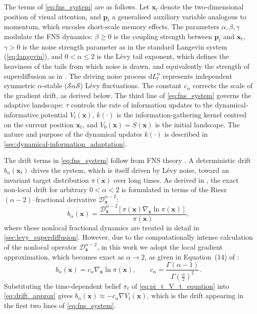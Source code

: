 The terms of \cref{eq:fns_system} are as follows. Let $\mathbf{x}_t$ denote the two-dimensional position of visual attention, and $\mathbf{p}_t$ a generalised auxiliary variable analogous to momentum, which encodes short-scale memory effects. The parameters $\alpha, \beta, \gamma$ modulate the FNS dynamics: $\beta \geq 0$ is the coupling strength between $\mathbf{p}_t$ and $\mathbf{x}_t$, $\gamma > 0$ is the noise strength parameter as in the standard Langevin system (\cref{eq:langevin}), and $0 < \alpha \le 2$ is the Lévy tail exponent, which defines the heaviness of the tails from which noise is drawn, and equivalently the strength of superdiffusion as in . The driving noise process $\mathrm{d}L_t^{\alpha}$ represents independent symmetric $\alpha$-stable ($\mathcal{S}\alpha\mathcal{S}$) L\'evy fluctuations. The constant $c_{\alpha}$ corrects the scale of the gradient drift, as derived below. The third line of \cref{eq:fns_system} governs the adaptive landscape: $\tau$ controls the rate of information updates to the dynamical-informative potential $V_t(\mathbf{x})$, $k(\cdot)$ is the information-gathering kernel centred on the current position $\mathbf{x}_t$, and $V_0(\mathbf{x}) = S(\mathbf{x})$ is the initial landscape. The nature and purpose of the dynamical updates $k(\cdot)$ is described in \cref{sec:dynamical-information_adaptation}.

The drift terms in \cref{eq:fns_system} follow from FNS theory \cite{qi_fractional_2022}. A deterministic drift $b_\alpha(\mathbf{x}_t)$ drives the system, which is itself driven by Lévy noise, toward an invariant target distribution $\pi(\mathbf{x})$ over long times. As derived in \cite{qi_fractional_2022}, the exact non-local drift for arbitrary $0 < \alpha < 2$ is formulated in terms of the Riesz $(\alpha - 2)$--fractional derivative $\mathcal{D}^{\alpha - 2}_{\mathbf{x}}$:
\begin{equation}\label{eq:full_drift}
	b_{\alpha}(\mathbf{x}) = \frac{\mathcal{D}^{\alpha - 2}_{\mathbf{x}}[\pi(\mathbf{x}) \nabla_{\mathbf{x}} \ln\pi(\mathbf{x})]}{\pi(\mathbf{x})},
\end{equation}
where these nonlocal fractional dynamics are treated in detail in \cref{sec:levy_superdiffusion}. However, due to the computationally intense calculation of the nonlocal operator $\mathcal{D}^{\alpha - 2}_{\mathbf{x}}$, in this work we adopt the local gradient approximation, which becomes exact as $\alpha \rightarrow 2$, as given in Equation~(14) of \cite{simsekli_fractional_nodate}:
\begin{equation}\label{eq:drift_approx}
	b_{\alpha}(\mathbf{x}) = c_{\alpha} \nabla_{\mathbf{x}} \ln \pi(\mathbf{x}), \qquad c_{\alpha} = \frac{\Gamma(\alpha - 1)}{\Gamma(\frac{\alpha}{2})^2}.
\end{equation}
Substituting the time-dependent belief $\pi_t$ of \cref{eq:pi_t_V_t_equation} into \cref{eq:drift_approx} gives $b_{\alpha}(\mathbf{x}) \approx -c_{\alpha}\nabla V_t(\mathbf{x})$, which is the drift appearing in the first two lines of \cref{eq:fns_system}.
